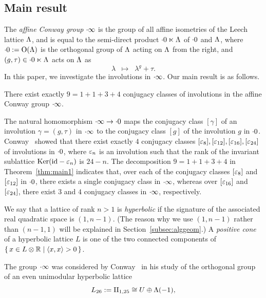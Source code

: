 \documentclass{amsart} %
\begin{document}
\subsection{Main result}
%
The \emph{affine Conway group} $\cdot \infty$ is the group of 
all affine isometries of the Leech lattice $\Lambda$,
and is equal to the semi-direct product $\cdot 0 \ltimes \Lambda$
of $\cdot 0$ and $\Lambda$,
where $\cdot 0:=\mathord{\mathrm{O}}(\Lambda)$ is the orthogonal group of $\Lambda$
acting on $\Lambda$ from the right, and 
$(g, \tau)\in \cdot 0 \ltimes \Lambda$ acts on $\Lambda$ as
\[
\lambda\;\;\mapsto\;\; \lambda^g+\tau.
\]
In this paper,
we investigate the involutions in $\cdot \infty$. 
Our main result is as follows.
%
%
%
\begin{theorem}\label{thm:main1}
There exist exactly 
$9=1+1+3+4$
conjugacy classes of involutions in the affine Conway group $\cdot \infty$.
\end{theorem}
%
The natural homomorphism $\cdot \infty \to \cdot 0$ maps
the conjugacy class $[\gamma]$ of an involution $\gamma=(g, \tau)$
in $\cdot \infty$ to the conjugacy class $[g]$ of the  involution $g$ in $\cdot 0$. 
Conway~\cite[Chapter 10,~Section 3.7]{theCSbook}
showed that there exist exactly $4$ conjugacy classes
$[\varepsilon_8], [\varepsilon_{12}], [\varepsilon_{16}], [\varepsilon_{24}]$ of  involutions  in $\cdot 0$,
where  $\varepsilon_n$ is an involution  such that  the rank of 
the invariant sublattice 
$\operatorname{Ker}(\mathord{\mathrm{id}}-\varepsilon_n)$ is $24-n$.
The decomposition $9=1+1+3+4$ in Theorem~\ref{thm:main1} 
indicates that, over each of the conjugacy classes $[\varepsilon_8]$ and $ [\varepsilon_{12}]$ in $\cdot 0$,
there exists a single conjugacy class in $\cdot \infty$,
whereas over %
$[\varepsilon_{16}]$  and~$ [\varepsilon_{24}]$, %
there exist  $3$ and $4$ conjugacy classes
in $\cdot \infty$, respectively.
\par
%
We say that a lattice of rank $n>1$ is \emph{hyperbolic}
if the signature of the associated real quadratic space is $(1, n-1)$.
(The reason why we use $(1, n-1)$ rather than $(n-1, 1)$  
will be explained in Section~\ref{subsec:alggeom}.)
A \emph{positive cone} of a hyperbolic lattice $L$
is one of the two connected components 
of $\{\,{x\in L\otimes \mathord{\mathbb{R}}}\mid {\langle x, x \rangle>0} \,\}$.
\par
The group $\cdot \infty$ was considered by Conway~\cite{MR690711}
 in his study of the orthogonal group of an even unimodular hyperbolic lattice
 \[
 L_{26}:=\mathrm{II}_{1,25} \cong U\oplus \Lambda(-1), 
\]
\end{document}
